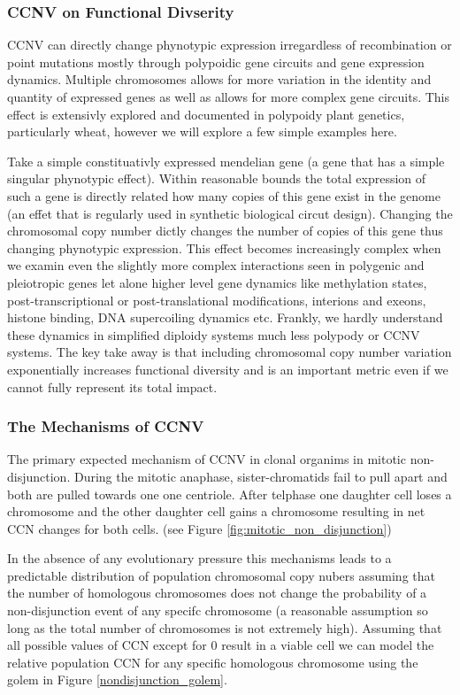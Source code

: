 \documentclass{article}
\begin{document}
    \subsubsection{CCNV on Functional Divserity}
    CCNV can directly change phynotypic expression irregardless of recombination or point mutations mostly through polypoidic gene circuits and gene expression dynamics.  Multiple chromosomes allows for more variation in the identity and quantity of expressed genes as well as allows for more complex gene circuits.  This effect is extensivly explored and documented in polypoidy plant genetics, particularly wheat, however we will explore a few simple examples here.  
    
    Take a simple constituativly expressed mendelian gene (a gene that has a simple singular phynotypic effect).  Within reasonable bounds the total expression of such a gene is directly related how many copies of this gene exist in the genome (an effet that is regularly used in synthetic biological circut design).  Changing the chromosomal copy number dictly changes the number of copies of this gene thus changing phynotypic expression.  This effect becomes increasingly complex when we examin even the slightly more complex interactions seen in polygenic and pleiotropic genes let alone higher level gene dynamics like methylation states, post-transcriptional or post-translational modifications, interions and exeons, histone binding, DNA supercoiling dynamics etc.  Frankly, we hardly understand these dynamics in simplified diploidy systems much less polypody or CCNV systems.  The key take away is that including chromosomal copy number variation exponentially increases functional diversity and is an important metric even if we cannot fully represent its total impact.

    \subsubsection{The Mechanisms of CCNV}\label{ccnv_mechanisms}
    The primary expected mechanism of CCNV in clonal organims in mitotic non-disjunction.  During the mitotic anaphase, sister-chromatids fail to pull apart and both are pulled towards one one centriole.  After telphase one daughter cell loses a chromosome and the other daughter cell gains a chromosome resulting in net CCN changes for both cells. (see Figure \ref{fig:mitotic_non_disjunction})

    In the absence of any evolutionary pressure this mechanisms leads to a predictable distribution of population chromosomal copy nubers assuming that the number of homologous chromosomes does not change the probability of a non-disjunction event of any specifc chromosome (a reasonable assumption so long as the total number of chromosomes is not extremely high).  Assuming that all possible values of CCN except for 0 result in a viable cell we can model the relative population CCN for any specific homologous chromosome using the golem in Figure \ref{nondisjunction_golem}.
\end{document}
